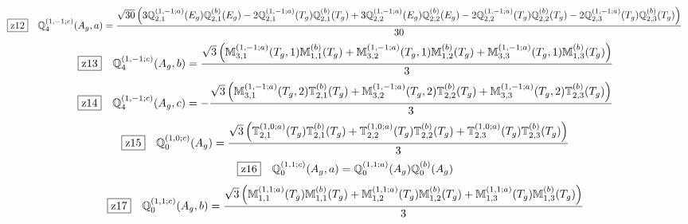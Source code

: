 \documentclass[fleqn,10pt,landscape]{jsarticle}
\begin{document}
\begin{dmath*}
\hspace*{3mm}\fbox{z12}\quad \mathbb{Q}_{4}^{(1,-1;c)}(A_{g},a)=\frac{\sqrt{30} \left(3 \mathbb{Q}_{2,1}^{(1,-1;a)}(E_{g}) \mathbb{Q}_{2,1}^{(b)}(E_{g}) - 2 \mathbb{Q}_{2,1}^{(1,-1;a)}(T_{g}) \mathbb{Q}_{2,1}^{(b)}(T_{g}) + 3 \mathbb{Q}_{2,2}^{(1,-1;a)}(E_{g}) \mathbb{Q}_{2,2}^{(b)}(E_{g}) - 2 \mathbb{Q}_{2,2}^{(1,-1;a)}(T_{g}) \mathbb{Q}_{2,2}^{(b)}(T_{g}) - 2 \mathbb{Q}_{2,3}^{(1,-1;a)}(T_{g}) \mathbb{Q}_{2,3}^{(b)}(T_{g})\right)}{30}
\end{dmath*}
\begin{dmath*}
\hspace*{3mm}\fbox{z13}\quad \mathbb{Q}_{4}^{(1,-1;c)}(A_{g},b)=\frac{\sqrt{3} \left(\mathbb{M}_{3,1}^{(1,-1;a)}(T_{g},1) \mathbb{M}_{1,1}^{(b)}(T_{g}) + \mathbb{M}_{3,2}^{(1,-1;a)}(T_{g},1) \mathbb{M}_{1,2}^{(b)}(T_{g}) + \mathbb{M}_{3,3}^{(1,-1;a)}(T_{g},1) \mathbb{M}_{1,3}^{(b)}(T_{g})\right)}{3}
\end{dmath*}
\begin{dmath*}
\hspace*{3mm}\fbox{z14}\quad \mathbb{Q}_{4}^{(1,-1;c)}(A_{g},c)=- \frac{\sqrt{3} \left(\mathbb{M}_{3,1}^{(1,-1;a)}(T_{g},2) \mathbb{T}_{2,1}^{(b)}(T_{g}) + \mathbb{M}_{3,2}^{(1,-1;a)}(T_{g},2) \mathbb{T}_{2,2}^{(b)}(T_{g}) + \mathbb{M}_{3,3}^{(1,-1;a)}(T_{g},2) \mathbb{T}_{2,3}^{(b)}(T_{g})\right)}{3}
\end{dmath*}
\begin{dmath*}
\hspace*{3mm}\fbox{z15}\quad \mathbb{Q}_{0}^{(1,0;c)}(A_{g})=\frac{\sqrt{3} \left(\mathbb{T}_{2,1}^{(1,0;a)}(T_{g}) \mathbb{T}_{2,1}^{(b)}(T_{g}) + \mathbb{T}_{2,2}^{(1,0;a)}(T_{g}) \mathbb{T}_{2,2}^{(b)}(T_{g}) + \mathbb{T}_{2,3}^{(1,0;a)}(T_{g}) \mathbb{T}_{2,3}^{(b)}(T_{g})\right)}{3}
\end{dmath*}
\begin{dmath*}
\hspace*{3mm}\fbox{z16}\quad \mathbb{Q}_{0}^{(1,1;c)}(A_{g},a)=\mathbb{Q}_{0}^{(1,1;a)}(A_{g}) \mathbb{Q}_{0}^{(b)}(A_{g})
\end{dmath*}
\begin{dmath*}
\hspace*{3mm}\fbox{z17}\quad \mathbb{Q}_{0}^{(1,1;c)}(A_{g},b)=\frac{\sqrt{3} \left(\mathbb{M}_{1,1}^{(1,1;a)}(T_{g}) \mathbb{M}_{1,1}^{(b)}(T_{g}) + \mathbb{M}_{1,2}^{(1,1;a)}(T_{g}) \mathbb{M}_{1,2}^{(b)}(T_{g}) + \mathbb{M}_{1,3}^{(1,1;a)}(T_{g}) \mathbb{M}_{1,3}^{(b)}(T_{g})\right)}{3}
\end{dmath*}
\end{document}

